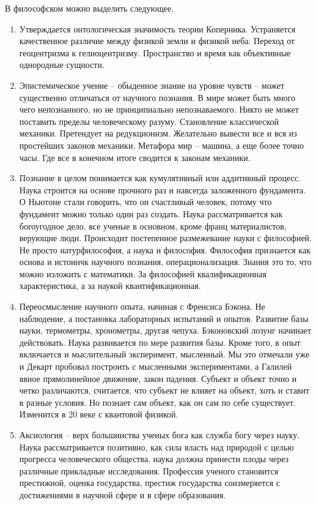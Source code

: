 \documentclass[a4paper, 12pt]{article}
\begin{document}
В философском можно выделить следующее.
\begin{enumerate}
  \item Утверждается онтологическая значимость теории Коперника. 
    Устраняется качественное различие между физикой земли и физикой 
    неба. Переход от геоцентризма к гелиоцентризму. Пространство и время 
    как объективные однородные сущности.
  \item Эпистемическое учение -- обыденное знание на уровне чувств -- 
    может существенно отличаться от научного познания. В мире может быть 
    много чего непознанного, но не принципиально непознаваемого. Никто 
    не может поставить пределы человеческому разуму. Становление 
    классической механики. Претендует на редукционизм. Желательно 
    вывести все и вся из простейших законов механики. Метафора мир -- 
    машина, а еще более точно часы. Где все в конечном итоге сводится 
    к законам механики.
  \item Познание в целом понимается как кумулятивный или аддитивный 
    процесс. Наука строится на основе прочного раз и навсегда 
    заложенного фундамента. О Ньютоне стали говорить, что он счастливый 
    человек, потому что фундамент можно только один раз создать. Наука 
    рассматривается как богоугодное дело, все ученые в основном, кроме 
    франц материалистов, верующие люди. Происходит постепенное 
    размежевание науки с философией. Не просто натурфилософия, а наука 
    и философия. Философия признается как основа и истоинчк научного 
    познания, операционализация. Знания это то, что можно изложить 
    с математики. За философией квалификационная характеристика, а за 
    наукой квантификационная.
  \item Переосмысление научного опыта, начиная с Френсиса Бэкона. Не 
    наблюдение, а постановка лабораторных испытаний и опытов. Развитие 
    базы науки, термометры, хронометры, другая чепуха. Бэконовский 
    лозунг начинает действовать. Наука развивается по мере развития 
    базы. Кроме того, в опыт включается и мыслительный эксперимент, 
    мысленный. Мы это отмечали уже и Декарт пробовал построить 
    с мысленными экспериментами, а Галилей явное прямолинейное движение, 
    закон падения. Субъект и объект точно и четко различаются, 
    считается, что субъект не влияет на объект, хоть и ставит в разные 
    условия. Но познает сам объект, как он сам по себе существует. 
    Изменится в 20 веке с квантовой физикой.
  \item Аксиология -- верх большинства ученых бога как служба богу через 
    науку. Наука рассматривается позитивно, как сила власть над природой 
    с целью прогресса человеческого общества, наука должна принести 
    плоды через различные прикладные исследования. Профессия ученого 
    становится престижной, оценка государства, престиж государства 
    соизмеряется с достижениями в научной сфере и в сфере образования.
\end{enumerate}
\end{document}
